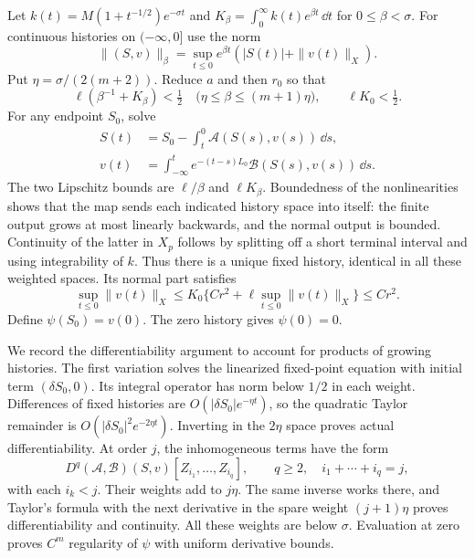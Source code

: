 Let $k(t)=M(1+t^{-1/2})e^{-\sigma t}$ and
$K_\beta=\int_0^\infty k(t)e^{\beta t}\,\dd t$ for
$0\le\beta<\sigma$. For continuous histories on $(-\infty,0]$
use the norm
\[
 \|(S,v)\|_\beta=
       \sup_{t\le0}e^{\beta t}(|S(t)|+\|v(t)\|_X).
\]
Put $\eta=\sigma/(2(m+2))$. Reduce $a$ and then $r_0$
so that
\begin{equation}\label{eq:history-contractions}
 \ell(\beta^{-1}+K_\beta)<\tfrac12
 \quad\bigl(\eta\le\beta\le(m+1)\eta\bigr),
 \qquad \ell K_0<\tfrac12.
\end{equation}
For any endpoint $S_0$, solve
\begin{equation}\label{eq:backward-fixed-point}
 \begin{aligned}
 S(t)&=S_0-\int_t^0\mathcal A(S(s),v(s))\,\dd s,\\
 v(t)&=\int_{-\infty}^t e^{-(t-s)L_0}
                               \mathcal B(S(s),v(s))\,\dd s.
 \end{aligned}
\end{equation}
The two Lipschitz bounds are $\ell/\beta$ and
$\ell K_\beta$. Boundedness of the nonlinearities shows
that the map sends each indicated history space into itself:
the finite output grows at most linearly backwards, and
the normal output is bounded. Continuity of the latter
in $X_p$ follows by splitting off a short terminal interval
and using integrability of $k$. Thus there is a unique
fixed history, identical in all these weighted spaces.
Its normal part satisfies
\[
 \sup_{t\le0}\|v(t)\|_X
 \le K_0\{Cr^2+\ell\sup_{t\le0}\|v(t)\|_X\}\le Cr^2.
\]
Define $\psi(S_0)=v(0)$. The zero history gives $\psi(0)=0$.

We record the differentiability argument to account for
products of growing histories. The first variation solves
the linearized fixed-point equation with initial term
$(\delta S_0,0)$. Its integral operator has norm below
$1/2$ in each weight. Differences of fixed histories are
$O(|\delta S_0|e^{-\eta t})$, so the quadratic Taylor
remainder is $O(|\delta S_0|^2e^{-2\eta t})$.
Inverting in the $2\eta$ space proves actual
differentiability. At order $j$, the inhomogeneous terms
have the form
\[
 D^q(\mathcal A,\mathcal B)(S,v)
                 [Z_{i_1},\ldots,Z_{i_q}],
 \qquad q\ge2,\quad i_1+\cdots+i_q=j,
\]
with each $i_k<j$. Their weights add to $j\eta$.
The same inverse works there, and Taylor's formula with
the next derivative in the spare weight $(j+1)\eta$
proves differentiability and continuity. All these weights
are below $\sigma$. Evaluation at zero proves $C^m$
regularity of $\psi$ with uniform derivative bounds.

